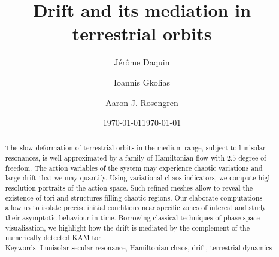 \documentclass{amsart}
\theoremstyle{definition}
\theoremstyle{remark}
\numberwithin{equation}{section}
\begin{document}
\title{Drift and its mediation in terrestrial orbits}

\author{J\'er\^ome Daquin}
\address{
Department of Mathematics ''Tullio Levi-Civita"
Via Trieste, 63, 35131 Padova, Italy.
}
\address{School of Science, RMIT University, RMIT City Campus, GPO Box 2476V, Melbourne Victoria 3001, Australia.}
\address{Space Environment Research Centre (SERC) Limited, Mount Stromlo Observatory, Canberra, Australian Capital Territory, Australia.}

\author{Ioannis Gkolias}
\address{Department of Aerospace Science and Technology, Politecnico di Milano, Milan, Italy.}

\author{Aaron J. Rosengren}
\address{Aerospace and Mechanical Engineering, University of Arizona, Tuscon, Arizona, United States.}

\date{\today}

\date{\today}

\dedicatory{}
\begin{abstract}
The slow deformation of terrestrial orbits in the medium range, subject to lunisolar resonances, is well approximated by a family of Hamiltonian flow with $2.5$ degree-of-freedom.  The action variables of the system may experience chaotic variations and large drift that we may quantify. Using variational chaos indicators, we compute high-resolution portraits of the action space. Such refined meshes allow to reveal the existence of tori and structures filling chaotic regions. Our elaborate computations allow us to isolate precise initial conditions near specific zones of interest  and  study their asymptotic behaviour in time.  Borrowing classical techniques of phase-space visualisation, we highlight how the
drift is mediated by the complement of the numerically detected  KAM tori.\\
 
\small{Keywords: Lunisolar secular resonance, Hamiltonian chaos, drift, terrestrial dynamics} 
\end{abstract}
\end{document}
